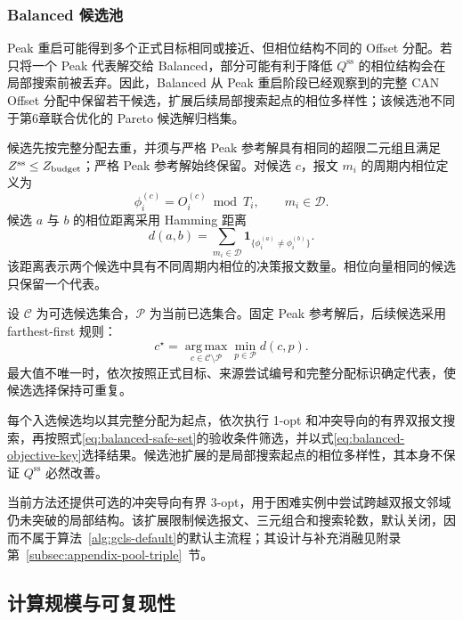 \documentclass[UTF8,a4paper,twoside,zihao=-4]{ctexart}
\numberwithin{equation}{section}
\numberwithin{figure}{section}
\numberwithin{table}{section}
\theoremstyle{definition}
\newcommand{\ind}[1]{\mathbf{1}_{\{#1\}}}
\numberwithin{algocf}{section}
\begin{document}
\subsubsection{Balanced 候选池}
\label{subsubsec:gcls-balanced-pool}

Peak 重启可能得到多个正式目标相同或接近、但相位结构不同的 Offset 分配。若只将一个 Peak 代表解交给 Balanced，部分可能有利于降低 $Q^{\mathrm{ss}}$ 的相位结构会在局部搜索前被丢弃。因此，Balanced 从 Peak 重启阶段已经观察到的完整 CAN Offset 分配中保留若干候选，扩展后续局部搜索起点的相位多样性；该候选池不同于第6章联合优化的 Pareto 候选解归档集。

候选先按完整分配去重，并须与严格 Peak 参考解具有相同的超限二元组且满足 $Z^{\mathrm{ss}}\le Z_{\rm budget}$；严格 Peak 参考解始终保留。对候选 $c$，报文 $m_i$ 的周期内相位定义为
\begin{equation}
 \phi_i^{(c)}
 =
 O_i^{(c)}\bmod T_i,
 \qquad m_i\in\mathcal D.
\label{eq:gcls-candidate-phase}
\end{equation}
候选 $a$ 与 $b$ 的相位距离采用 Hamming 距离
\begin{equation}
 d(a,b)
 =
 \sum_{m_i\in\mathcal D}
 \ind{\phi_i^{(a)}\ne\phi_i^{(b)}}.
\label{eq:gcls-phase-distance}
\end{equation}
该距离表示两个候选中具有不同周期内相位的决策报文数量。相位向量相同的候选只保留一个代表。

设 $\mathcal C$ 为可选候选集合，$\mathcal P$ 为当前已选集合。固定 Peak 参考解后，后续候选采用 farthest-first 规则：
\begin{equation}
 c^\star
 =
 \operatorname*{arg\,max}_{c\in\mathcal C\setminus\mathcal P}
 \min_{p\in\mathcal P}d(c,p).
\label{eq:gcls-farthest-first}
\end{equation}
最大值不唯一时，依次按照正式目标、来源尝试编号和完整分配标识确定代表，使候选选择保持可重复。

每个入选候选均以其完整分配为起点，依次执行 1-opt 和冲突导向的有界双报文搜索，再按照式\eqref{eq:balanced-safe-set}的验收条件筛选，并以式\eqref{eq:balanced-objective-key}选择结果。候选池扩展的是局部搜索起点的相位多样性，其本身不保证 $Q^{\mathrm{ss}}$ 必然改善。

当前方法还提供可选的冲突导向有界 3-opt，用于困难实例中尝试跨越双报文邻域仍未突破的局部结构。该扩展限制候选报文、三元组合和搜索轮数，默认关闭，因而不属于算法~\ref{alg:gcls-default}的默认主流程；其设计与补充消融见附录第~\ref{subsec:appendix-pool-triple}~节。

\subsection{计算规模与可复现性}
\label{subsec:gcls-boundaries}
\end{document}

